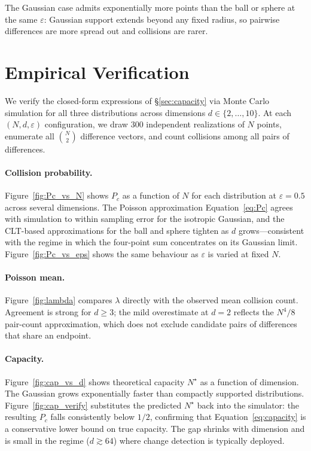 \documentclass{article}
\newcommand\figref{Figure~\ref}
\renewcommand\eqref{Equation~\ref}
\newcommand*{\secref}[1]{\hyperref[{#1}]{\S\ref*{#1}}}
\begin{document}
The Gaussian case admits exponentially more points than the ball or sphere at the same $\varepsilon$: Gaussian support extends beyond any fixed radius, so pairwise differences are more spread out and collisions are rarer.

\section{Empirical Verification}
\label{sec:empirical}

We verify the closed-form expressions of \secref{sec:capacity} via Monte Carlo simulation for all three distributions across dimensions $d \in \{2, \dots, 10\}$. At each $(N, d, \varepsilon)$ configuration, we draw $300$ independent realizations of $N$ points, enumerate all $\binom{N}{2}$ difference vectors, and count collisions among all pairs of differences.

\paragraph{Collision probability.} \figref{fig:Pc_vs_N} shows $P_c$ as a function of $N$ for each distribution at $\varepsilon = 0.5$ across several dimensions. The Poisson approximation \eqref{eq:Pc} agrees with simulation to within sampling error for the isotropic Gaussian, and the CLT-based approximations for the ball and sphere tighten as $d$ grows---consistent with the regime in which the four-point sum concentrates on its Gaussian limit. \figref{fig:Pc_vs_eps} shows the same behaviour as $\varepsilon$ is varied at fixed $N$.

\paragraph{Poisson mean.} \figref{fig:lambda} compares $\lambda$ directly with the observed mean collision count. Agreement is strong for $d \ge 3$; the mild overestimate at $d = 2$ reflects the $N^4/8$ pair-count approximation, which does not exclude candidate pairs of differences that share an endpoint.

\paragraph{Capacity.} \figref{fig:cap_vs_d} shows theoretical capacity $N^\star$ as a function of dimension. The Gaussian grows exponentially faster than compactly supported distributions. \figref{fig:cap_verify} substitutes the predicted $N^\star$ back into the simulator: the resulting $P_c$ falls consistently below $1/2$, confirming that \eqref{eq:capacity} is a conservative lower bound on true capacity. The gap shrinks with dimension and is small in the regime ($d \gtrsim 64$) where change detection is typically deployed.
\end{document}
